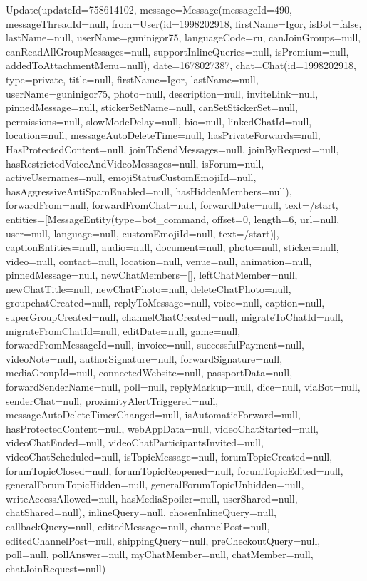 Update(updateId=758614102,
message=Message(messageId=490, messageThreadId=null,
from=User(id=1998202918, firstName=Igor, isBot=false, lastName=null, userName=guninigor75, languageCode=ru, canJoinGroups=null, canReadAllGroupMessages=null, supportInlineQueries=null, isPremium=null, addedToAttachmentMenu=null), date=1678027387,
chat=Chat(id=1998202918, type=private, title=null, firstName=Igor, lastName=null, userName=guninigor75, photo=null, description=null, inviteLink=null, pinnedMessage=null, stickerSetName=null, canSetStickerSet=null, permissions=null, slowModeDelay=null, bio=null, linkedChatId=null, location=null, messageAutoDeleteTime=null, hasPrivateForwards=null, HasProtectedContent=null, joinToSendMessages=null, joinByRequest=null, hasRestrictedVoiceAndVideoMessages=null, isForum=null, activeUsernames=null, emojiStatusCustomEmojiId=null, hasAggressiveAntiSpamEnabled=null, hasHiddenMembers=null), forwardFrom=null, forwardFromChat=null, forwardDate=null, text=/start, entities=[MessageEntity(type=bot_command, offset=0, length=6, url=null, user=null, language=null, customEmojiId=null, text=/start)], captionEntities=null, audio=null, document=null, photo=null, sticker=null, video=null, contact=null, location=null, venue=null, animation=null, pinnedMessage=null, newChatMembers=[], leftChatMember=null, newChatTitle=null, newChatPhoto=null, deleteChatPhoto=null, groupchatCreated=null, replyToMessage=null, voice=null, caption=null, superGroupCreated=null, channelChatCreated=null, migrateToChatId=null, migrateFromChatId=null, editDate=null, game=null, forwardFromMessageId=null, invoice=null, successfulPayment=null, videoNote=null, authorSignature=null, forwardSignature=null, mediaGroupId=null, connectedWebsite=null, passportData=null, forwardSenderName=null, poll=null, replyMarkup=null, dice=null, viaBot=null, senderChat=null, proximityAlertTriggered=null, messageAutoDeleteTimerChanged=null, isAutomaticForward=null, hasProtectedContent=null, webAppData=null, videoChatStarted=null, videoChatEnded=null, videoChatParticipantsInvited=null, videoChatScheduled=null, isTopicMessage=null, forumTopicCreated=null, forumTopicClosed=null, forumTopicReopened=null, forumTopicEdited=null, generalForumTopicHidden=null, generalForumTopicUnhidden=null, writeAccessAllowed=null, hasMediaSpoiler=null, userShared=null, chatShared=null), inlineQuery=null, chosenInlineQuery=null, callbackQuery=null, editedMessage=null, channelPost=null, editedChannelPost=null, shippingQuery=null, preCheckoutQuery=null, poll=null, pollAnswer=null, myChatMember=null, chatMember=null, chatJoinRequest=null)


